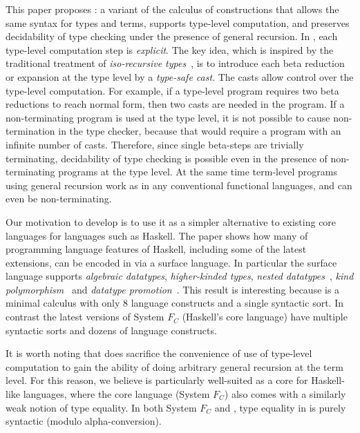 This paper proposes \name: a variant of the calculus of constructions
that allows the same syntax for types and terms, supports type-level
computation, and preserves decidability of type checking under the
presence of general recursion. In \name, each type-level computation
step is \emph{explicit}.  The key idea, which is inspired by the traditional
treatment of \emph{iso-recursive types}~\cite{tapl}, is to introduce each beta
reduction or expansion at the type level by a \emph{type-safe
  cast}. The
casts allow control over the type-level computation. For example, if
a type-level program requires two beta reductions to reach normal
form, then two casts are needed in the program. If a non-terminating
program is used at the type level, it is not possible to cause
non-termination in the type checker, because that would require a
program with an infinite number of casts. Therefore, since single beta-steps are
trivially terminating, decidability of type checking is possible even
in the presence of non-terminating programs at the type level.
At the same time term-level programs using general recursion 
work as in any conventional functional languages, and can even 
be non-terminating. 

Our motivation to develop \name is to use it as a simpler alternative
to existing core languages for languages such as Haskell. 
The paper shows how many of programming language features of
Haskell, including some of the latest extensions, can be encoded in
\name via a surface language. In particular the surface language
supports \emph{algebraic datatypes}, \emph{higher-kinded types},
\emph{nested datatypes}~\cite{nesteddt}, \emph{kind polymorphism}~\cite{fc:pro} and
\emph{datatype promotion}~\cite{fc:pro}.  This result is interesting because
\name is a minimal calculus with only 8 language constructs and a
single syntactic sort. In contrast the latest versions of System
$F_{C}$ (Haskell's core language) have multiple syntactic sorts and
dozens of language constructs.  

It is worth noting that \name does sacrifice the convenience of use of type-level computation
to gain the ability of doing arbitrary general recursion at the term
level.  For this reason, we believe \name is particularly well-suited
as a core for Haskell-like languages, where the core language (System
$F_{C}$) also comes with a similarly weak notion of type equality.  In
both System $F_{C}$ and \name, type equality in \name is purely
syntactic (modulo alpha-conversion).

